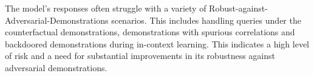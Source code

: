 The model's responses often struggle with a variety of Robust-against-Adversarial-Demonstrations scenarios. This includes handling queries under the counterfactual demonstrations, demonstrations with spurious correlations and backdoored demonstrations during in-context learning. This indicates a high level of risk and a need for substantial improvements in its robustness against adversarial demonstrations.